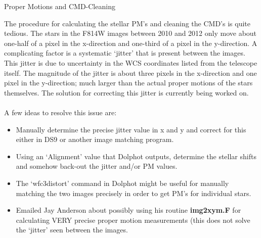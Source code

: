 \documentclass[12pt]{article}
\begin{document}
\begin{section}{Proper Motions and CMD-Cleaning}

The procedure for calculating the stellar PM's and cleaning the CMD's is quite tedious. The stars in the F814W images between 2010 and 2012 only move about one-half of a pixel in the x-direction and one-third of a pixel in the y-direction. A complicating factor is a systematic `jitter' that is present between the images. This jitter is due to uncertainty in the WCS coordinates listed from the telescope itself. The magnitude of the jitter is about three pixels in the x-direction and one pixel in the y-direction; much larger than the actual proper motions of the stars themselves. The solution for correcting this jitter is currently being worked on. \\
\\ 
A few ideas to resolve this issue are:
\begin{itemize}
\item Manually determine the precise jitter value in x and y and correct for this either in DS9 or another image matching program.
\item Using an `Alignment' value that Dolphot outputs, determine the stellar shifts and somehow back-out the jitter and/or PM values.
\item The `wfc3distort' command in Dolphot might be useful for manually matching the two images precisely in order to get PM's for individual stars.
\item Emailed Jay Anderson about possibly using his routine \textbf{img2xym.F} for calculating VERY precise proper motion measurements (this does not solve the `jitter' seen between the images.
\end{itemize}



\end{section}






 
\end{document}
